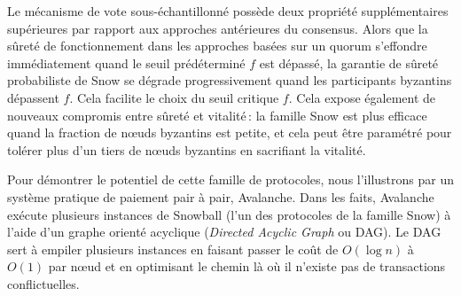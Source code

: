\documentclass[letterpaper,twocolumn,10pt]{article}
\newcommand{\Oh}[1]{O(#1)}
\newcommand{\editchange}[1]{{\color{orange}#1}}
\theoremstyle{definition}
\begin{document}
Le mécanisme de vote sous-échantillonné possède deux propriété supplémentaires supérieures par rapport aux approches antérieures du consensus.
Alors que la sûreté de fonctionnement dans les approches basées sur un quorum s'effondre immédiatement quand le seuil prédéterminé $f$ est dépassé,
la garantie de sûreté probabiliste de Snow se dégrade progressivement quand les participants byzantins dépassent $f$.
Cela facilite le choix du seuil critique $f$.
Cela expose également de nouveaux compromis entre sûreté et vitalité\,: la famille Snow est plus efficace quand la fraction de nœuds byzantins est petite, et cela peut être paramétré pour tolérer plus d'un tiers de nœuds byzantins en sacrifiant la vitalité.

Pour démontrer le potentiel de cette famille de protocoles, nous l'illustrons par un système pratique de paiement pair à pair, Avalanche. Dans les faits, Avalanche exécute plusieurs instances de Snowball (l'un des protocoles de la famille Snow) à l'aide d'un graphe orienté acyclique (\emph{Directed Acyclic Graph} ou DAG). Le DAG sert à empiler plusieurs instances en faisant passer le coût de $\Oh{\log{n}}$ à $\Oh{1}$ par nœud et en optimisant le chemin là où il n'existe pas de transactions conflictuelles.
%
\end{document}
